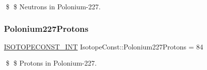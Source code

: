 \$ \$ Neutrons in Polonium-\/227. \mbox{\label{group___isotope_const-_polonium-_po227_ga51ff064ee1ba780c00d66c9faa1dfcd2}} 
\subsubsection{\texorpdfstring{Polonium227\+Protons}{Polonium227Protons}}
{\footnotesize\ttfamily \mbox{\hyperlink{group___isotope_const-_macros_ga5f18360b3e99483a35c32d789e62621c}{I\+S\+O\+T\+O\+P\+E\+C\+O\+N\+S\+T\+\_\+\+I\+NT}} Isotope\+Const\+::\+Polonium227\+Protons = 84}

\$ \$ Protons in Polonium-\/227. 
